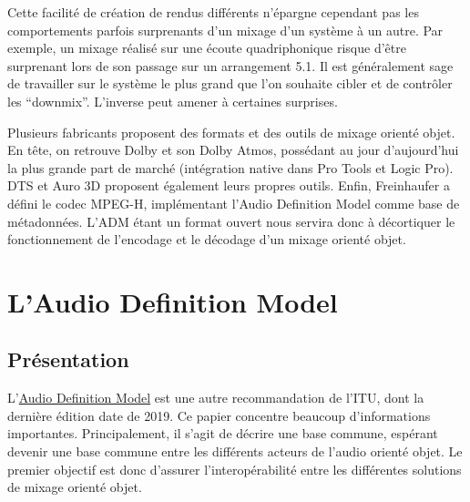 \documentclass[
  letterpaper,
  DIV=11,
  numbers=noendperiod]{scrreprt}
\begin{document}
\begin{tcolorbox}[enhanced jigsaw, leftrule=.75mm, arc=.35mm, bottomtitle=1mm, colback=white, colbacktitle=quarto-callout-warning-color!10!white, opacityback=0, left=2mm, rightrule=.15mm, opacitybacktitle=0.6, breakable, toptitle=1mm, titlerule=0mm, bottomrule=.15mm, toprule=.15mm, coltitle=black, title=\textcolor{quarto-callout-warning-color}{\faExclamationTriangle}\hspace{0.5em}{Avertissement}]

Cette facilité de création de rendus différents n'épargne cependant pas
les comportements parfois surprenants d'un mixage d'un système à un
autre. Par exemple, un mixage réalisé sur une écoute quadriphonique
risque d'être surprenant lors de son passage sur un arrangement 5.1. Il
est généralement sage de travailler sur le système le plus grand que
l'on souhaite cibler et de contrôler les ``downmix''. L'inverse peut
amener à certaines surprises.

\end{tcolorbox}

Plusieurs fabricants proposent des formats et des outils de mixage
orienté objet. En tête, on retrouve Dolby et son Dolby Atmos, possédant
au jour d'aujourd'hui la plus grande part de marché (intégration native
dans Pro Tools et Logic Pro). DTS et Auro 3D proposent également leurs
propres outils. Enfin, Freinhaufer a défini le codec MPEG-H,
implémentant l'Audio Definition Model comme base de métadonnées. L'ADM
étant un format ouvert nous servira donc à décortiquer le fonctionnement
de l'encodage et le décodage d'un mixage orienté objet.

\hypertarget{laudio-definition-model}{%
\section{L'Audio Definition Model}\label{laudio-definition-model}}

\hypertarget{pruxe9sentation}{%
\subsection{Présentation}\label{pruxe9sentation}}

L'\href{https://www.itu.int/rec/R-REC-BS.2076-2-201910-I/en}{Audio
Definition Model} est une autre recommandation de l'ITU, dont la
dernière édition date de 2019. Ce papier concentre beaucoup
d'informations importantes. Principalement, il s'agit de décrire une
base commune, espérant devenir une base commune entre les différents
acteurs de l'audio orienté objet. Le premier objectif est donc d'assurer
l'interopérabilité entre les différentes solutions de mixage orienté
objet.
\end{document}
